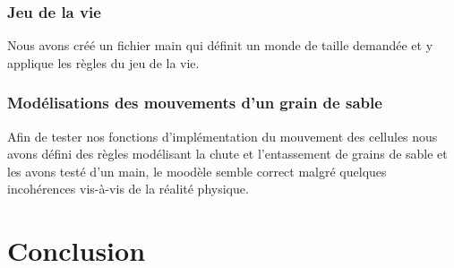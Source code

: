 \documentclass{article}
\begin{document}
{{{        
        
            }
        
        
        \subsubsection{Jeu de la vie}
            {
            Nous avons créé un fichier main qui définit un monde de taille demandée et y applique les règles du jeu de la vie.
        
        
            }
        
        \subsubsection{Modélisations des mouvements d'un grain de sable}
            {
            
            Afin de tester nos fonctions d'implémentation du mouvement des cellules nous avons défini des règles modélisant la chute et l'entassement de grains de sable et les avons testé d'un main, le moodèle semble correct malgré quelques incohérences vis-à-vis de la réalité physique.
            
            }
        
        
        
        }
    
    }

\newpage
\section{Conclusion}

    {
    
    
    
    
    
    }
\newpage
{}
\end{document}
